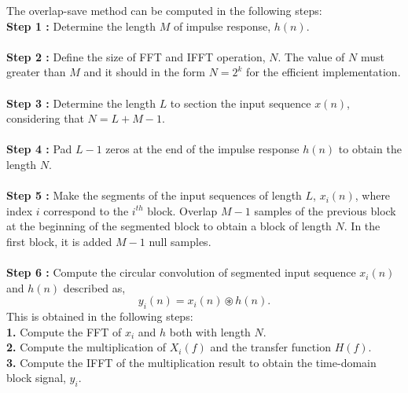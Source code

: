 The overlap-save method can be computed in the following steps:\\
\textbf{ Step 1 :} Determine the length $M$ of impulse response, $h(n)$.\\ \\ 
\textbf{ Step 2 :} Define the size of FFT and IFFT operation, $N$. The value of $N$ must greater than $M$ and it should in the form $N = 2^k$ for the efficient implementation.\\ \\
\textbf{ Step 3 :} Determine the length $L$ to section the input sequence $x(n)$, considering that $N=L+M-1$.\\ \\   
\textbf{ Step 4 :} Pad $L-1$ zeros at the end of the impulse response $h(n)$ to obtain the length $N$.\\ \\
\textbf{ Step 5 :} Make the segments of the input sequences of length $L$, $x_i(n)$, where index $i$ correspond to the $i^{th}$ block. Overlap $M-1$ samples of the previous block at the beginning of the segmented block to obtain a block of length $N$. In the first block, it is added $M-1$ null samples.\\ \\
\textbf{ Step 6 :} Compute the circular convolution of segmented input sequence $x_i(n)$ and $h(n)$ described as,
\begin{equation}
y_i(n)= x_i(n) \circledast h(n).
\label{genFIR}
\end{equation}
This is obtained in the following steps:\\
\textbf{1. } Compute the FFT of $x_i$ and $h$ both with length $N$.\\
\textbf{2. }Compute the multiplication of $X_i(f)$ and the transfer function $H(f)$.\\
\textbf{3. }Compute the IFFT of the multiplication result to obtain the time-domain block signal, $y_i$.\\ \\
